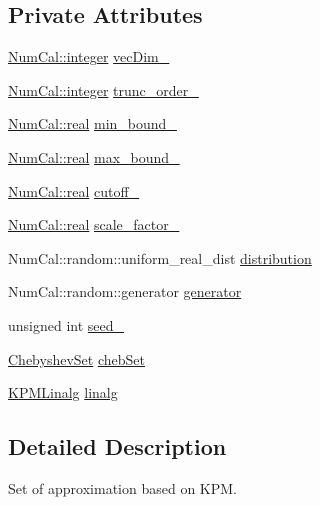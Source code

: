 \subsection*{Private Attributes}
\begin{DoxyCompactItemize}
\item 
\hyperlink{namespaceNumCal_ae1031b42812e871d8f5bd9b7b15fc7d8}{Num\+Cal\+::integer} \hyperlink{classNumCal_1_1Kpm_a4ac4a7a755edc98dcecbe0871b331d60}{vec\+Dim\+\_\+}
\item 
\hyperlink{namespaceNumCal_ae1031b42812e871d8f5bd9b7b15fc7d8}{Num\+Cal\+::integer} \hyperlink{classNumCal_1_1Kpm_a9306617bc9ed19bee31a900d916601f2}{trunc\+\_\+order\+\_\+}
\item 
\hyperlink{namespaceNumCal_ac10564761316cff6fb75fe8bfccd6def}{Num\+Cal\+::real} \hyperlink{classNumCal_1_1Kpm_a18eba97bab8e60ce25886f2b0445f040}{min\+\_\+bound\+\_\+}
\item 
\hyperlink{namespaceNumCal_ac10564761316cff6fb75fe8bfccd6def}{Num\+Cal\+::real} \hyperlink{classNumCal_1_1Kpm_a6aff2cd50b5f91123c5638f9f5f8b674}{max\+\_\+bound\+\_\+}
\item 
\hyperlink{namespaceNumCal_ac10564761316cff6fb75fe8bfccd6def}{Num\+Cal\+::real} \hyperlink{classNumCal_1_1Kpm_a642a669599d105532db6f7381ae03a7f}{cutoff\+\_\+}
\item 
\hyperlink{namespaceNumCal_ac10564761316cff6fb75fe8bfccd6def}{Num\+Cal\+::real} \hyperlink{classNumCal_1_1Kpm_af400f702eb1525f25a4eca3b896f69e9}{scale\+\_\+factor\+\_\+}
\item 
Num\+Cal\+::random\+::uniform\+\_\+real\+\_\+dist \hyperlink{classNumCal_1_1Kpm_acee26c7b6af3442b38556d761c172038}{distribution}
\item 
Num\+Cal\+::random\+::generator \hyperlink{classNumCal_1_1Kpm_a9b09edf906b41f5c4109e7df953e8000}{generator}
\item 
unsigned int \hyperlink{classNumCal_1_1Kpm_a1ffffb62aa49a0428a7959889607c873}{seed\+\_\+}
\item 
\hyperlink{classNumCal_1_1ChebyshevSet}{Chebyshev\+Set} \hyperlink{classNumCal_1_1Kpm_af2c38bda650ee0c6127efc49f508e08b}{cheb\+Set}
\item 
\hyperlink{classKPMLinalg}{K\+P\+M\+Linalg} \hyperlink{classNumCal_1_1Kpm_a5bbe79f73705e403ec18880b29197d9f}{linalg}
\end{DoxyCompactItemize}


\subsection{Detailed Description}
Set of approximation based on K\+P\+M. 

